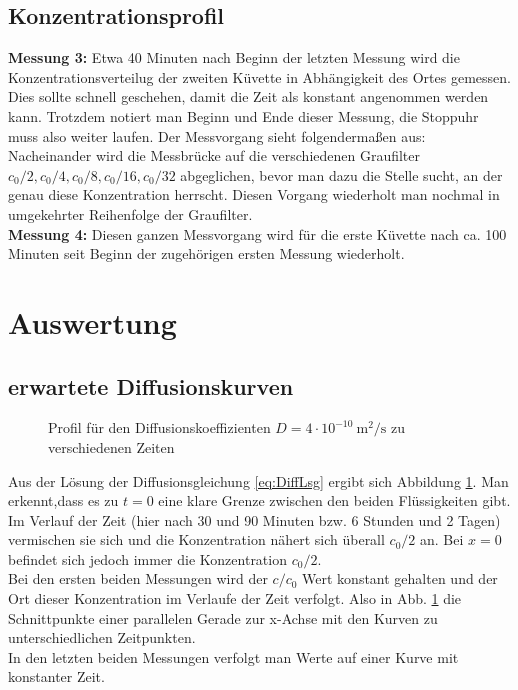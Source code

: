 \documentclass[12pt,a4paper,titlepage,headinclude,bibtotoc]{scrartcl}
\begin{document}
\subsection{Konzentrationsprofil}
\textbf{Messung 3:}
Etwa 40 Minuten nach Beginn der letzten Messung wird die Konzentrationsverteilug der zweiten Küvette in Abhängigkeit des Ortes gemessen.
Dies sollte schnell geschehen, damit die Zeit als konstant angenommen werden kann.
Trotzdem notiert man Beginn und Ende dieser Messung, die Stoppuhr muss also weiter laufen.
Der Messvorgang sieht folgendermaßen aus:
Nacheinander wird die Messbrücke auf die verschiedenen Graufilter $c_0/2, c_0/4, c_0/8, c_0/16, c_0/32$ abgeglichen, bevor man dazu die Stelle sucht, an der genau diese Konzentration herrscht.
Diesen Vorgang wiederholt man nochmal in umgekehrter Reihenfolge der Graufilter.\\
\textbf{Messung 4:}
Diesen ganzen Messvorgang wird für die erste Küvette nach ca. 100 Minuten  seit Beginn der zugehörigen ersten Messung wiederholt. 

\section{Auswertung}
\label{sec:auswertung}
\subsection{erwartete Diffusionskurven}
\begin{figure}
	
	\caption{Profil für den Diffusionskoeffizienten $D=4\cdot 10^{-10} ~ \si{\meter ^2 / \second}$ zu verschiedenen Zeiten}
	\label{fig:erwDiffKurve}
\end{figure}

Aus der Lösung der Diffusionsgleichung \eqref{eq:DiffLsg} ergibt sich Abbildung \ref{fig:erwDiffKurve}.
Man erkennt,dass es zu $t=0$ eine klare Grenze zwischen den beiden Flüssigkeiten gibt.
Im Verlauf der Zeit (hier nach 30 und 90 Minuten bzw. 6 Stunden und 2 Tagen) vermischen sie sich und die Konzentration nähert sich überall $c_0/2$ an.
Bei $x=0$ befindet sich jedoch immer die Konzentration $c_0/2$.\\
Bei den ersten beiden Messungen wird der $c/c_0$ Wert konstant gehalten und der Ort dieser Konzentration im Verlaufe der Zeit verfolgt.
Also in Abb. \ref{fig:erwDiffKurve} die Schnittpunkte einer parallelen Gerade zur x-Achse mit den Kurven zu unterschiedlichen Zeitpunkten.\\
In den letzten beiden Messungen verfolgt man Werte auf einer Kurve mit konstanter Zeit.
\end{document}

